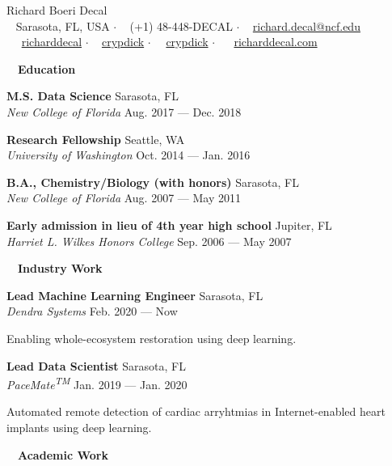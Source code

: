 \documentclass[a4paper,12pt]{article}
\newcommand{\resheading}[1]{{\hspace{-9pt} \colorbox{mygrey}{\begin{minipage}{\textwidth}{\textmd{~~\large \textbf{#1} \vphantom{p\^{E}}}}\end{minipage}}\vspace{6pt}} }
\newcommand{\ressubheading}[4]{{\begin{minipage}{\textwidth}
        \textbf{#1} \hfill #2 \\
        \textit{#3} \hfill #4 \\
        \end{minipage}}}
\begin{document}
\begin{center}
{\Huge Richard Boeri Decal} \\
{\small \faMapMarker~ Sarasota, FL, USA $\cdot$ \faPhone~ (+1) 48-448-DECAL $\cdot$ \faEnvelope~ \href{mailto:richard.decal@ncf.edu}{richard.decal@ncf.edu}  \\ ~\faLinkedin~ \href{https://www.linkedin.com/in/richarddecal/}{richarddecal} $\cdot$ \faGithubAlt~ \href{https://github.com/crypdick}{crypdick}   $\cdot$~\faStackOverflow~  \href{https://stackoverflow.com/users/4212158/crypdick}{crypdick} $\cdot$  ~\faHome~  \href{http://www.richarddecal.com}{richarddecal.com}} %
\end{center}


\resheading{Education}

    \ressubheading{M.S. Data Science}{Sarasota, FL}{New College of Florida}{Aug. 2017 --- Dec. 2018}


    \ressubheading{Research Fellowship}{Seattle, WA}{University of Washington}{Oct. 2014 --- Jan. 2016}
 
    \ressubheading{B.A., Chemistry/Biology (with honors)}{Sarasota, FL}{New College of Florida}{Aug. 2007 --- May 2011}

    \ressubheading{Early admission in lieu of 4th year high school}{Jupiter, FL}{Harriet L. Wilkes Honors College}{Sep. 2006 --- May 2007}
    
\resheading{Industry Work}

\ressubheading{Lead Machine Learning Engineer}{Sarasota, FL}{Dendra Systems}{Feb. 2020 --- Now}

\vspace{-6pt} Enabling whole-ecosystem restoration using deep learning.\\

\ressubheading{Lead Data Scientist}{Sarasota, FL}{PaceMate\textsuperscript{TM}}{Jan. 2019 --- Jan. 2020}

\vspace{-6pt} Automated remote detection of cardiac arryhtmias in Internet-enabled heart implants using deep learning.\\

\resheading{Academic Work}
\end{document}
